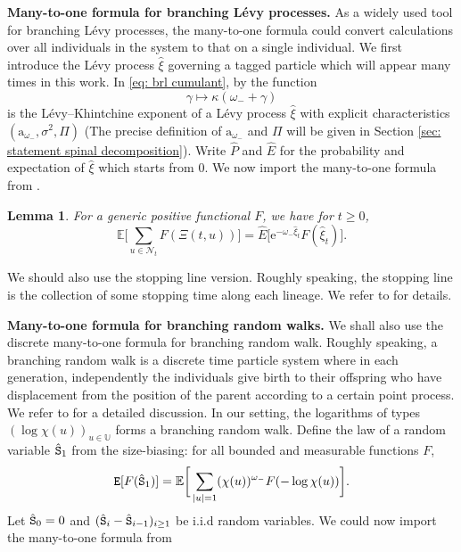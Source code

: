 \documentclass[12pt]{article}
\numberwithin{equation}{section}
\theoremstyle{plain}
\newtheorem{lem}[thm]{Lemma}
\theoremstyle{definition}
\begin{document}
\noindent \textbf{Many-to-one formula for branching L\'evy processes. } As a widely used tool for branching L\'evy processes, the many-to-one formula could convert calculations over all  individuals in the system to that on a single individual. We first introduce the L\'evy process $\hat{\xi}$ governing a tagged particle which will appear many times in this work. In \eqref{eq: brl cumulant}, by  \cite[Lemma 5.5]{BertoinJean2024SMta} the function \begin{equation}
\gamma \mapsto \kappa(\omega_-+\gamma) \label{eq: brl spine} \end{equation} is the L\'evy--Khintchine exponent of a L\'evy process $\hat{\xi}$ with explicit characteristics $(\mathrm{a}_{\omega_-}, \sigma^2, \Pi)$ (The precise definition of $\mathrm{a}_{\omega_-}$ and $\Pi$ will be given in Section \ref{sec: statement spinal decomposition}).  Write $\hat{P}$ and $\hat{E}$ for the probability and expectation of $\hat{\xi}$ which starts from $0$. We now import the many-to-one formula from \cite[Lemma 3.1]{MalleinBastien2023Anas}.
\begin{lem}\label{lem: brl many-to-one}
For a generic positive functional $F$, we have for $t\geq 0$,
\begin{equation}\label{eq: brl many-to-one}
\mathbb{E}\bigg[\sum_{u\in\mathcal{N}_t} F(\Xi(t,u))\bigg] = \hat{E}\bigg[\mathrm{e}^{-\omega_- \hat{\xi}_t}F(\hat\xi_t)\bigg].
\end{equation}

\end{lem}

\noindent We should also use the stopping line version. Roughly speaking, the stopping line is the collection of some stopping time along each lineage. We refer to \cite{BigginsJ.D.2004Mcim} for details.

\bigskip

\noindent \textbf{Many-to-one formula for branching random walks.} We shall also use the discrete many-to-one formula for branching random walk. Roughly speaking, a branching random walk is a discrete time particle system where in each generation, independently the individuals give birth to their offspring who have displacement from the position of the parent according to a certain point process. We refer to \cite{ShiZhan2016BRWE} for a detailed discussion. In our setting, the logarithms of types $(\log \chi(u))_{u\in \mathbb U}$ forms a branching random walk. Define the law of a random variable ${\hat{\tt S}}_1$ from the size-biasing: for all bounded and measurable functions $F$,
\[{\tt E}[F({\hat{\tt S}}_1)] = \mathbb{E}\bigg[\sum_{|u| = 1} (\chi(u))^{\omega_- } F(-\log \chi(u))\bigg].\]
Let ${\hat{\tt S}}_0 = 0$ and $({\hat{\tt S}}_i-{\hat{\tt S}}_{i-1})_{i\geq 1}$ be i.i.d random variables. We could now import the many-to-one formula from {\cite[Theorem 1.1]{ShiZhan2016BRWE}}
\end{document}
